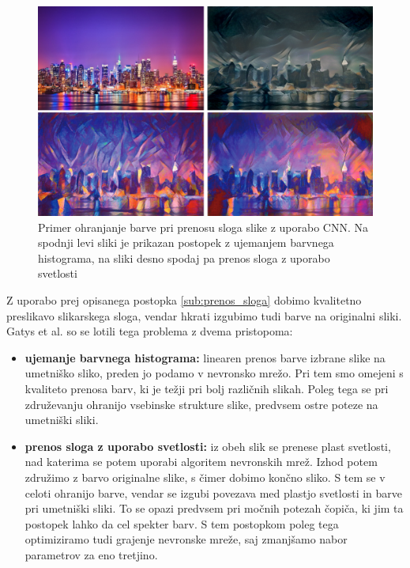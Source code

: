 \documentclass[runningheads,a4paper]{llncs}
\begin{document}
\begin{figure}
\centering
\includegraphics[width=120mm]{figures/prenos_barve.png}
\caption{Primer ohranjanje barve pri prenosu sloga slike z uporabo CNN. Na spodnji levi sliki je prikazan postopek z ujemanjem barvnega histograma, na sliki desno spodaj pa prenos sloga z uporabo svetlosti}
\label{fig:prenos_barve}
\end{figure}

Z uporabo prej opisanega postopka \ref{sub:prenos_sloga} dobimo kvalitetno preslikavo slikarskega sloga, vendar hkrati izgubimo tudi barve na originalni sliki. Gatys et al. \cite{prenos_barve} so se lotili tega problema z dvema pristopoma: 

\begin{itemize}
\item \textbf{ujemanje barvnega histograma:} linearen prenos barve izbrane slike na umetniško sliko, preden jo podamo v nevronsko mrežo. Pri tem smo omejeni s kvaliteto prenosa barv, ki je težji pri bolj različnih slikah. Poleg tega se pri združevanju ohranijo vsebinske strukture slike, predvsem ostre poteze na umetniški sliki.

\item \textbf{prenos sloga z uporabo svetlosti:} iz obeh slik se prenese plast svetlosti, nad katerima se potem uporabi algoritem nevronskih mrež. Izhod potem združimo z barvo originalne slike, s čimer dobimo končno sliko. S tem se v celoti ohranijo barve, vendar se izgubi povezava med plastjo svetlosti in barve pri umetniški sliki. To se opazi predvsem pri močnih potezah čopiča, ki jim ta postopek lahko da cel spekter barv. S tem postopkom poleg tega optimiziramo tudi grajenje nevronske mreže, saj zmanjšamo nabor parametrov za eno tretjino.
\end{itemize}
\end{document}
